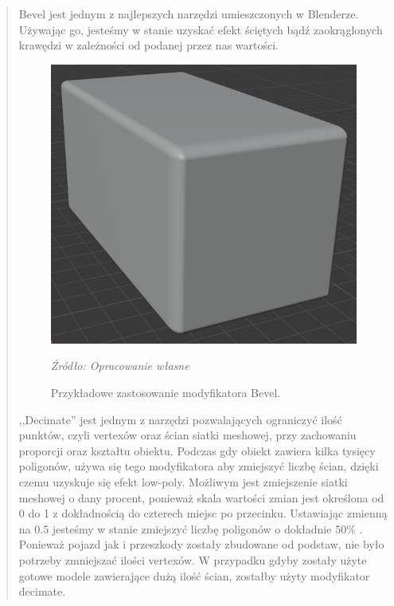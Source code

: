 \begin{quotation}
\indent Bevel jest jednym z najlepszych narzędzi umieszczonych w Blenderze. Używając go, jesteśmy w stanie uzyskać efekt ściętych bądź zaokrąglonych krawędzi w zależności od podanej przez nas wartości.

\begin{figure}[!hbt]
\centering
  \includegraphics[width=0.8\linewidth]{bevel.png}
  \caption{Przykładowe zastosowanie modyfikatora Bevel.}\label{rys_7}
  \begin{minipage}[t]{0.75\linewidth}
    \emph{Źródło: Opracowanie własne}
  \end{minipage}
\end{figure}

\newpage
\indent ,,Decimate'' jest jednym z narzędzi pozwalających ograniczyć ilość punktów, czyli vertexów oraz ścian siatki meshowej, przy zachowaniu proporcji oraz kształtu obiektu. Podczas gdy obiekt zawiera kilka tysięcy poligonów, używa się tego modyfikatora aby zmiejszyć liczbę ścian, dzięki czemu uzyskuje się efekt low-poly. Możliwym jest zmiejszenie siatki meshowej o dany procent, ponieważ skala wartości zmian jest określona od 0 do 1 z dokładnością do czterech miejsc po przecinku. Ustawiając zmienną na 0.5 jesteśmy w stanie zmiejszyć liczbę poligonów o dokładnie 50\% \cite{3}.  Ponieważ pojazd jak i przeszkody zostały zbudowane od podstaw, nie było potrzeby zmniejszać ilości vertexów. W przypadku gdyby zostały użyte gotowe modele zawierające dużą ilość ścian, zostałby użyty modyfikator decimate.


\end{quotation}
